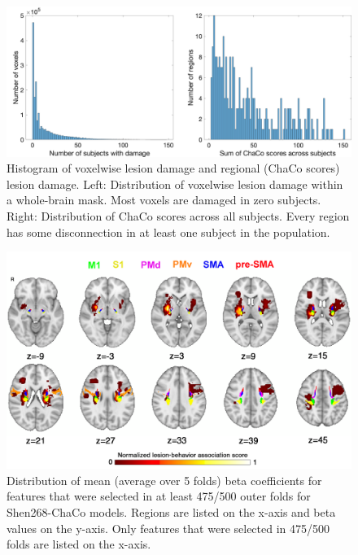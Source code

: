 \documentclass[10pt]{article}
\begin{document}
\begin{figure}[htp]
\centering
\includegraphics[width=1\linewidth]{figures/histogram_voxels_chaco.png}
\caption{Histogram of voxelwise lesion damage and regional (ChaCo scores) lesion damage. Left:  Distribution of voxelwise lesion damage within a whole-brain mask. Most voxels are damaged in zero subjects. Right: Distribution of ChaCo scores across all subjects. Every region has some disconnection in at least one subject in the population. }
\label{histogram_voxels_chaco}
\end{figure}


\begin{figure}[htp]
\centering
\includegraphics[width=1\linewidth]{figures/lbm_vs_smatt.png}
\caption{Distribution of mean (average over 5 folds) beta coefficients for features that were selected in at least 475/500 outer folds for Shen268-ChaCo models. Regions are listed on the x-axis and beta values on the y-axis. Only features that were selected in 475/500 folds are listed on the x-axis.}
\label{shen_beta_coeffs}
\end{figure}
\end{document}
